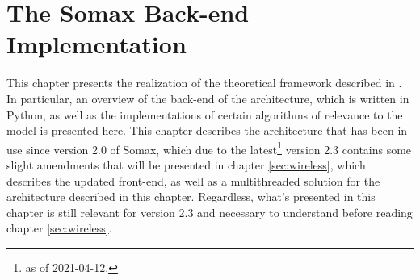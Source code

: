 \section{The Somax Back-end Implementation} \label{ch:implementation}
This chapter presents the realization of the theoretical framework described in \cite{somaxtheory2021}. In particular, an overview of the back-end of the architecture, which is written in Python, as well as the implementations of certain  algorithms of relevance to the model is presented here. This chapter describes the architecture that has been in use since version 2.0 of Somax, which due to the latest\footnote{as of 2021-04-12.} version 2.3 contains some slight amendments that will be presented in chapter \ref{sec:wireless}, which describes the updated front-end, as well as a multithreaded solution for the architecture described in this chapter. Regardless, what's presented in this chapter is still relevant for version 2.3 and necessary to understand before reading chapter \ref{sec:wireless}.




